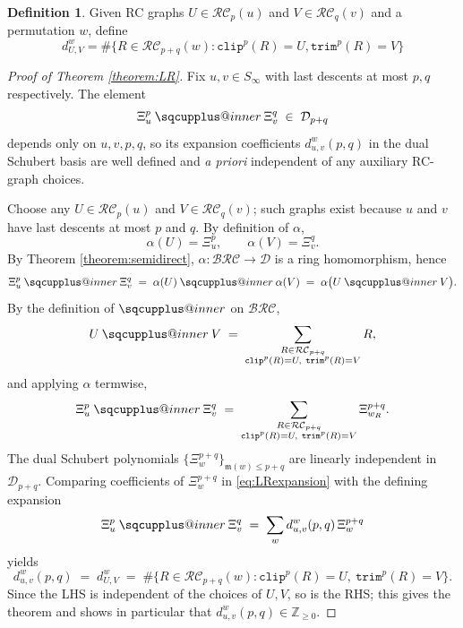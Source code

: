 \documentclass[a4paper,fleqn]{cas-sc}
\makeatletter
\newcommand{\sqcupplus@inner}[2]{%
  \vcenter{\hbox{\ooalign{%
    \hfil$\m@th#1\sqcup$\hfil\cr
    \hfil\raisebox{0.15ex}{$\m@th#1\scriptscriptstyle+$}\hfil\cr
  }}}%
}
\newcommand{\sqcupplus}{\mathbin{\mathpalette\sqcupplus@inner\relax}}
\newtheorem{proposition}[lemma]{Proposition}
\theoremstyle{definition}
\newtheorem{definition}[lemma]{Definition}
\theoremstyle{remark}
\numberwithin{equation}{subsection}
\newcommand{\wof}[1]{w_{#1}}
\newcommand{\trm}{\mathtt{trim}}
\newcommand{\clp}{\mathtt{clip}}
\newcommand{\BRC}{\mathcal{BRC}}
\newcommand{\RC}{\mathcal{RC}}
\newcommand{\dsch}{\ensuremath{\Xi}}
\newcommand{\dcoma}{\mathcal{D}}
\newcommand{\maxd}{\mathfrak{m}}
\makeatother
\begin{document}


\begin{definition}
Given RC graphs $U\in \RC_p(u)$ and $V\in\RC_q(v)$ and a permutation $w$, define
$$d_{U, V}^w = \#\{R\in \RC_{p+q}(w): \clp^p(R)=U,\trm^p(R)=V\}$$
\end{definition}

\begin{proof}[Proof of Theorem \ref{theorem:LR}]
Fix $u,v\in S_\infty$ with last descents at most $p,q$ respectively. The element
$$\dsch_u^p\sqcupplus\dsch_v^q\;\in\;\dcoma_{p+q}$$
depends only on $u,v,p,q$, so its expansion coefficients $d_{u,v}^w(p,q)$ in the dual Schubert basis are well defined and \emph{a priori} independent of any auxiliary RC-graph choices.

Choose any $U\in\RC_p(u)$ and $V\in\RC_q(v)$; such graphs exist because $u$ and $v$ have last descents at most $p$ and $q$. By definition of $\alpha$,
$$\alpha(U)=\dsch_u^p,\qquad \alpha(V)=\dsch_v^q.$$
By Theorem \ref{theorem:semidirect}, $\alpha:\BRC\to\dcoma$ is a ring homomorphism, hence
$$\dsch_u^p\sqcupplus\dsch_v^q\;=\;\alpha(U)\sqcupplus\alpha(V)\;=\;\alpha\bigl(U\sqcupplus V\bigr).$$
By the definition of $\sqcupplus$ on $\BRC$,
$$U\sqcupplus V\;=\;\sum_{\substack{R\in\RC_{p+q}\\ \clp^p(R)=U,\ \trm^p(R)=V}} R,$$
and applying $\alpha$ termwise,
\begin{equation}\label{eq:LRexpansion}
\dsch_u^p\sqcupplus\dsch_v^q\;=\;\sum_{\substack{R\in\RC_{p+q}\\ \clp^p(R)=U,\ \trm^p(R)=V}}\dsch_{\wof{R}}^{p+q}.
\end{equation}
The dual Schubert polynomials $\{\dsch_w^{p+q}\}_{\maxd(w)\leq p+q}$ are linearly independent in $\dcoma_{p+q}$. Comparing coefficients of $\dsch_w^{p+q}$ in \eqref{eq:LRexpansion} with the defining expansion
$$\dsch_u^p\sqcupplus\dsch_v^q\;=\;\sum_w d_{u,v}^w(p,q)\,\dsch_w^{p+q}$$
yields
$$d_{u,v}^w(p,q)\;=\;d_{U,V}^w\;=\;\#\bigl\{R\in\RC_{p+q}(w):\clp^p(R)=U,\ \trm^p(R)=V\bigr\}.$$
Since the LHS is independent of the choices of $U,V$, so is the RHS; this gives the theorem and shows in particular that $d_{u,v}^w(p,q)\in\mathbb{Z}_{\geq 0}$.
\end{proof}
\end{document}
